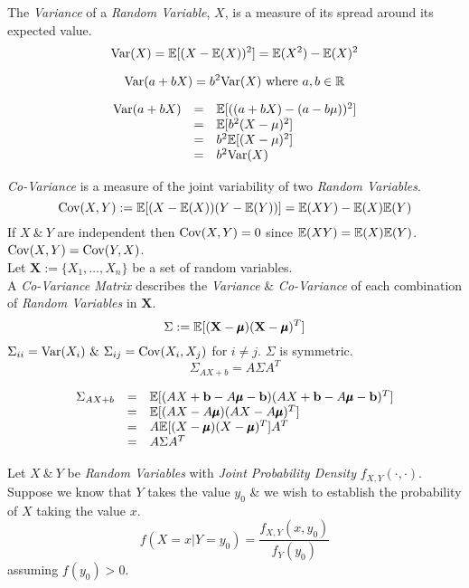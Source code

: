 \documentclass[11pt,a4paper]{article}
\begin{document}
The \textit{Variance} of a \textit{Random Variable}, $X$, is a measure of its spread around its expected value.
$$\mathrm{Var}(X)=\mathbb{E}[(X-\mathbb{E}(X))^2]=\mathbb{E}(X^2)-\mathbb{E}(X)^2$$

$$\mathrm{Var}(a+bX)=b^2\mathrm{Var}(X)\text{ where }a,b\in\mathbb{R}$$

\[\begin{array}{rcl}
\mathrm{Var}(a+bX)&=&\mathbb{E}[((a+bX)-(a-b\mu))^2]\\
&=&\mathbb{E}[b^2(X-\mu)^2]\\
&=&b^2\mathbb{E}[(X-\mu)^2]\\
&=&b^2\mathrm{Var}(X)
\end{array}\]

\textit{Co-Variance} is a measure of the joint variability of two \textit{Random Variables}.
$$\mathrm{Cov}(X,Y):=\mathbb{E}[(X-\mathbb{E}(X))(Y-\mathbb{E}(Y))]=\mathbb{E}(XY)-\mathbb{E}(X)\mathbb{E}(Y)$$
\nb If $X\ \&\ Y$ are independent then $\mathrm{Cov}(X,Y)=0$ since $\mathbb{E}(XY)=\mathbb{E}(X)\mathbb{E}(Y)$.\\
\nb $\mathrm{Cov}(X,Y)=\mathrm{Cov}(Y,X)$.\\

Let $\textbf{X}:=\{X_1,\dots,X_n\}$ be a set of random variables.\\
A \textit{Co-Variance Matrix} describes the \textit{Variance} \& \textit{Co-Variance} of each combination of \textit{Random Variables} in $\textbf{X}$.\\
$$\Sigma:=\mathbb{E}[(\textbf{X}-\pmb\mu)(\textbf{X}-\pmb\mu)^T]$$
\nb $\Sigma_{ii}=\var(X_i)\ \&\ \Sigma_{ij}=\cov(X_i,X_j)$ for $i\neq j$. $\Sigma$ is symmetric.\\

$$\Sigma_{AX+b}=A\Sigma A^T$$

\[\begin{array}{rcl}
\Sigma_{AX+b}&=&\mathbb{E}[(AX+\textbf{b}-A\pmb\mu-\textbf{b})(AX+\textbf{b}-A\pmb\mu-\textbf{b})^T]\\
&=&\mathbb{E}[(AX-A\pmb\mu)(AX-A\pmb\mu)^T]\\
&=&A\mathbb{E}[(X-\pmb\mu)(X-\pmb\mu)^T]A^T\\
&=&A\Sigma A^T
\end{array}\]

Let $X\ \&\ Y$ be \textit{Random Variables} with \textit{Joint Probability Density} $f_{X,Y}(\cdot,\cdot)$.\\
Suppose we know that $Y$ takes the value $y_0$ \& we wish to establish the probability of $X$ taking the value $x$.
$$f(X=x|Y=y_0)=\dfrac{f_{X,Y}(x,y_0)}{f_Y(y_0)}$$
assuming $f(y_0)>0$.\\
\end{document}

